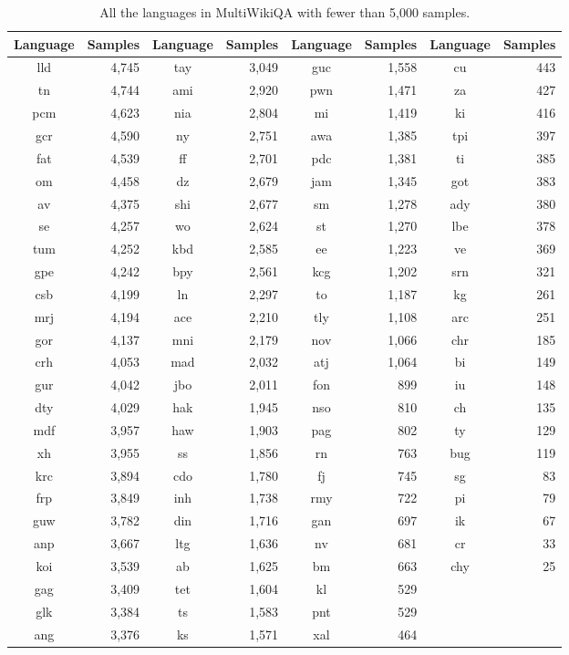 \documentclass[10pt, a4paper]{article}
\begin{document}
\begin{table}[h]
    \centering
    \scriptsize
    \begin{tabular}{cr|cr|cr|cr}
        \textbf{Language} & \textbf{Samples} & \textbf{Language} & \textbf{Samples} & \textbf{Language} & \textbf{Samples} & \textbf{Language} & \textbf{Samples} \\
        \midrule
        lld & 4,745 & tay & 3,049 & guc & 1,558 & cu & 443 \\
        tn & 4,744 & ami & 2,920 & pwn & 1,471 & za & 427 \\
        pcm & 4,623 & nia & 2,804 & mi & 1,419 & ki & 416 \\
        gcr & 4,590 & ny & 2,751 & awa & 1,385 & tpi & 397 \\
        fat & 4,539 & ff & 2,701 & pdc & 1,381 & ti & 385 \\
        om & 4,458 & dz & 2,679 & jam & 1,345 & got & 383 \\
        av & 4,375 & shi & 2,677 & sm & 1,278 & ady & 380 \\
        se & 4,257 & wo & 2,624 & st & 1,270 & lbe & 378 \\
        tum & 4,252 & kbd & 2,585 & ee & 1,223 & ve & 369 \\
        gpe & 4,242 & bpy & 2,561 & kcg & 1,202 & srn & 321 \\
        csb & 4,199 & ln & 2,297 & to & 1,187 & kg & 261 \\
        mrj & 4,194 & ace & 2,210 & tly & 1,108 & arc & 251 \\
        gor & 4,137 & mni & 2,179 & nov & 1,066 & chr & 185 \\
        crh & 4,053 & mad & 2,032 & atj & 1,064 & bi & 149 \\
        gur & 4,042 & jbo & 2,011 & fon & 899 & iu & 148 \\
        dty & 4,029 & hak & 1,945 & nso & 810 & ch & 135 \\
        mdf & 3,957 & haw & 1,903 & pag & 802 & ty & 129 \\
        xh & 3,955 & ss & 1,856 & rn & 763 & bug & 119 \\
        krc & 3,894 & cdo & 1,780 & fj & 745 & sg & 83 \\
        frp & 3,849 & inh & 1,738 & rmy & 722 & pi & 79 \\
        guw & 3,782 & din & 1,716 & gan & 697 & ik & 67 \\
        anp & 3,667 & ltg & 1,636 & nv & 681 & cr & 33 \\
        koi & 3,539 & ab & 1,625 & bm & 663 & chy & 25 \\
        gag & 3,409 & tet & 1,604 & kl & 529 &&\\
        glk & 3,384 & ts & 1,583 & pnt & 529 &&\\
        ang & 3,376 & ks & 1,571 & xal & 464 &&
    \end{tabular}
    \caption{All the languages in MultiWikiQA with fewer than 5,000 samples.}
    \label{tab:num-samples-in-small-subsets}
\end{table}
\end{document}
